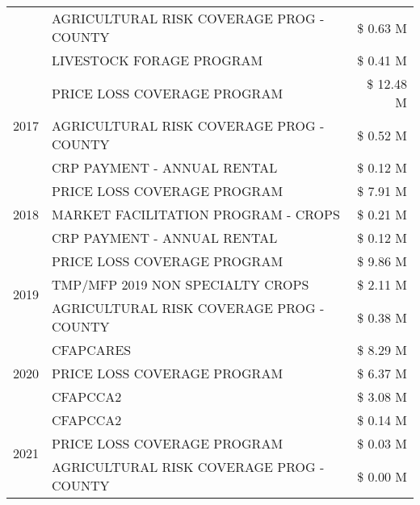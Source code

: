 \begin{tabular}{llr}
 & AGRICULTURAL RISK COVERAGE PROG - COUNTY & \$ 0.63 M \\
 & LIVESTOCK FORAGE PROGRAM & \$ 0.41 M \\
\cline{1-3}
\multirow[t]{3}{*}{2017} & PRICE LOSS COVERAGE PROGRAM & \$ 12.48 M \\
 & AGRICULTURAL RISK COVERAGE PROG - COUNTY & \$ 0.52 M \\
 & CRP PAYMENT - ANNUAL RENTAL & \$ 0.12 M \\
\cline{1-3}
\multirow[t]{3}{*}{2018} & PRICE LOSS COVERAGE PROGRAM & \$ 7.91 M \\
 & MARKET FACILITATION PROGRAM - CROPS & \$ 0.21 M \\
 & CRP PAYMENT - ANNUAL RENTAL & \$ 0.12 M \\
\cline{1-3}
\multirow[t]{3}{*}{2019} & PRICE LOSS COVERAGE PROGRAM & \$ 9.86 M \\
 & TMP/MFP 2019 NON SPECIALTY CROPS & \$ 2.11 M \\
 & AGRICULTURAL RISK COVERAGE PROG - COUNTY & \$ 0.38 M \\
\cline{1-3}
\multirow[t]{3}{*}{2020} & CFAPCARES & \$ 8.29 M \\
 & PRICE LOSS COVERAGE PROGRAM & \$ 6.37 M \\
 & CFAPCCA2 & \$ 3.08 M \\
\cline{1-3}
\multirow[t]{3}{*}{2021} & CFAPCCA2 & \$ 0.14 M \\
 & PRICE LOSS COVERAGE PROGRAM & \$ 0.03 M \\
 & AGRICULTURAL RISK COVERAGE PROG - COUNTY & \$ 0.00 M \\
\cline{1-3}
\bottomrule
\end{tabular}
